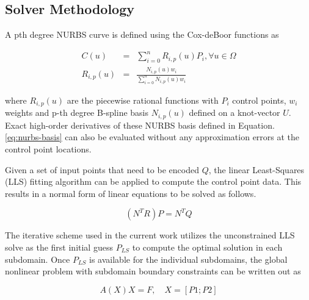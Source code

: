 \documentclass[conference]{IEEEtran}
\begin{document}

\subsection{Solver Methodology}

A pth degree NURBS curve \cite{nurbs-book} is defined using the Cox-deBoor functions as

\begin{eqnarray}
C(u) &=& \sum_{i=0}^{n} R_{i,p}(u) P_i, \forall u \in \Omega \\
R_{i,p}(u) &=& \frac{N_{i,p}(u) w_i}{\sum_{i=0}^{n} N_{i,p}(u) w_i}
\label{eq:nurbs-basis}
\end{eqnarray}

where $R_{i,p}(u)$ are the piecewise rational functions with $P_i$ control points, $w_i$ weights and p-th degree B-spline basis $N_{i,p}(u)$ defined on a knot-vector $U$. Exact high-order derivatives of these NURBS basis defined in Equation. \ref{eq:nurbs-basis} can also be evaluated without any approximation errors at the control point locations.

Given a set of input points that need to be encoded $Q$, the linear Least-Squares (LLS) fitting algorithm can be applied to compute the control point data. This results in a normal form of linear equations to be solved as follows.

\begin{equation}
(N^T R) P = N^T Q
\end{equation}

The iterative scheme used in the current work utilizes the unconstrained LLS solve as the first initial guess $P_{LS}$ to compute the optimal solution in each subdomain. Once $P_{LS}$ is available for the individual subdomains, the global nonlinear problem with subdomain boundary constraints can be written out as

\begin{equation}
A(X) X = F, \quad X = \left[P1 ; P2 \right]
\label{eq:global-system}
\end{equation}
\end{document}
